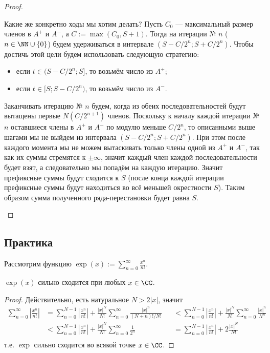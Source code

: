 \documentclass[12pt,a4paper]{article}
\begin{document}
\begin{proof}
\begin{enumerate}
            Какие же конкретно ходы мы хотим делать? Пусть $C_0$ --- максимальный размер членов в $A^+$ и $A^-$, а $C := \max(C_0, S+1)$. Тогда на итерации № $n$ ($n \in \NN \cup \{0\}$) будем удерживаться в интервале $(S-C/2^n; S+C/2^n)$. Чтобы достичь этой цели будем использовать следующую стратегию:
            \begin{itemize}
                \item если $t \in (S-C/2^n; S]$, то возьмём число из $A^+$;
                \item если $t \in [S; S-C/2^n)$, то возьмём число из $A^-$.
            \end{itemize}
            Заканчивать итерацию № $n$ будем, когда из обеих последовательностей будут вытащены первые $N(C/2^{n+1})$ членов. Поскольку к началу каждой итерации № $n$ оставшиеся члены в $A^+$ и $A^-$ по модулю меньше $C/2^n$, то описанными выше шагами мы не выйдем из интервала $(S-C/2^n; S+C/2^n)$. При этом после каждого момента мы не можем вытаскивать только члены одной из $A^+$ и $A^-$, так как их суммы стремятся к $\pm \infty$, значит каждый член каждой последовательности будет взят, а следовательно мы попадём на каждую итерацию. Значит префиксные суммы будут сходится к $S$ (после конца каждой итерации префиксные суммы будут находиться во всё меньшей окрестности $S$). Таким образом сумма полученного ряда-перестановки будет равна $S$.
        \end{enumerate}
    \end{proof}

    \subsection*{Практика}

    Рассмотрим функцию $\exp(x) := \sum_{n=0}^\infty \frac{x^n}{n!}$.

    \begin{statement}
        $\exp(x)$ сильно сходится при любых $x \in \CC$.
    \end{statement}

    \begin{proof}
        Действительно, есть натуральное $N > 2|x|$, значит
        \begin{align*}
            \sum_{n=0}^\infty \left|\frac{x^n}{n!}\right|
            &= \sum_{n=0}^{N-1} \left|\frac{x^n}{n!}\right| + \frac{|x|^N}{N!}\sum_{n=0}^\infty \frac{|x|^n}{(N+n)!/N!}&
            &< \sum_{n=0}^{N-1} \left|\frac{x^n}{n!}\right| + \frac{|x|^N}{N!}\sum_{n=0}^\infty \frac{|x|^n}{N^n}\\
            &< \sum_{n=0}^{N-1} \left|\frac{x^n}{n!}\right| + \frac{|x|^N}{N!}\sum_{n=0}^\infty \frac{1}{2^n}&
            &= \sum_{n=0}^{N-1} \left|\frac{x^n}{n!}\right| + 2\frac{|x|^N}{N!}\\
        \end{align*}
        т.е. $\exp$ сильно сходится во всякой точке $x \in \CC$.
    \end{proof}
\end{document}
